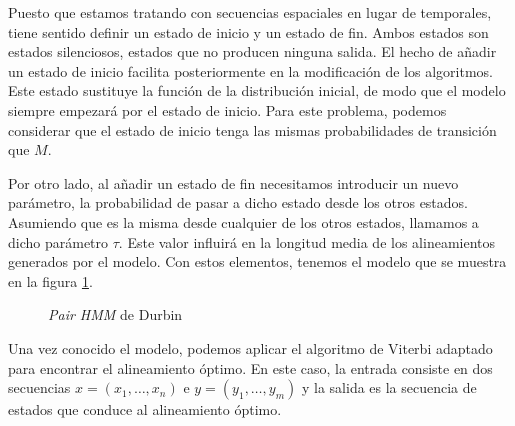 Puesto que estamos tratando con secuencias espaciales en lugar de temporales, tiene sentido definir un estado de inicio y un estado de fin. Ambos estados son estados silenciosos, estados que no producen ninguna salida. El hecho de añadir un estado de inicio facilita posteriormente en la modificación de los algoritmos. Este estado sustituye la función de la distribución inicial, de modo que el modelo siempre empezará por el estado de inicio. Para este problema, podemos considerar que el estado de inicio tenga las mismas probabilidades de transición que $M$.

Por otro lado, al añadir un estado de fin necesitamos introducir un nuevo parámetro, la probabilidad de pasar a dicho estado desde los otros estados. Asumiendo que es la misma desde cualquier de los otros estados, llamamos a dicho parámetro $\tau$. Este valor influirá en la longitud media de los alineamientos generados por el modelo. Con estos elementos, tenemos el modelo que se muestra en la figura \ref{pairEjemplo}.

\begin{figure}
\centering
{}
\caption{\textit{Pair HMM} de Durbin}
\label{pairEjemplo}
\end{figure}
Una vez conocido el modelo, podemos aplicar el algoritmo de Viterbi adaptado para encontrar el alineamiento óptimo. En este caso, la entrada consiste en dos secuencias $x=(x_1,\dots,x_n)$ e $y=(y_1,\dots,y_m)$ y la salida es la secuencia de estados que conduce al alineamiento óptimo. 

